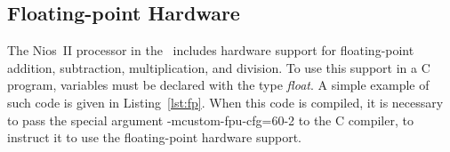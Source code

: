 \subsection{Floating-point Hardware}
\label{sec:fp}

The Nios~II processor in the \systemName~includes hardware support for
floating-point addition, subtraction, multiplication, and division. To use this support in
a C program, variables must be declared with the type {\it float}. A simple example of 
such code is given in Listing~\ref{lst:fp}. When this code is compiled, it is necessary to
pass the special argument {\sf -mcustom-fpu-cfg=60-2} to the C compiler, to instruct it to 
use the floating-point hardware support.


